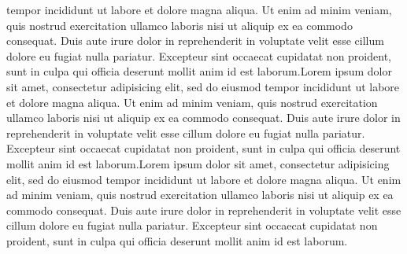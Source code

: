 tempor incididunt ut labore et dolore magna aliqua. Ut enim ad minim veniam,
quis nostrud exercitation ullamco laboris nisi ut aliquip ex ea commodo
consequat. Duis aute irure dolor in reprehenderit in voluptate velit esse
cillum dolore eu fugiat nulla pariatur. Excepteur sint occaecat cupidatat non
proident, sunt in culpa qui officia deserunt mollit anim id est laborum.Lorem ipsum dolor sit amet, consectetur adipisicing elit, sed do eiusmod
tempor incididunt ut labore et dolore magna aliqua. Ut enim ad minim veniam,
quis nostrud exercitation ullamco laboris nisi ut aliquip ex ea commodo
consequat. Duis aute irure dolor in reprehenderit in voluptate velit esse
cillum dolore eu fugiat nulla pariatur. Excepteur sint occaecat cupidatat non
proident, sunt in culpa qui officia deserunt mollit anim id est laborum.Lorem ipsum dolor sit amet, consectetur adipisicing elit, sed do eiusmod
tempor incididunt ut labore et dolore magna aliqua. Ut enim ad minim veniam,
quis nostrud exercitation ullamco laboris nisi ut aliquip ex ea commodo
consequat. Duis aute irure dolor in reprehenderit in voluptate velit esse
cillum dolore eu fugiat nulla pariatur. Excepteur sint occaecat cupidatat non
proident, sunt in culpa qui officia deserunt mollit anim id est laborum.